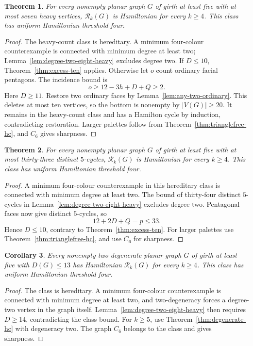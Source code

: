 \documentclass[11pt]{article}
\newtheorem{theorem}{Theorem}[section]
\newtheorem{corollary}[theorem]{Corollary}
\theoremstyle{remark}
\newcommand{\Rk}{\mathcal R_k}
\numberwithin{equation}{section}
\numberwithin{table}{section}
\begin{document}
\begin{theorem}\label{thm:seven-heavy}
For every nonempty planar graph $G$ of girth at least five with at
most seven heavy vertices, $\Rk(G)$ is Hamiltonian for every $k\ge4$.
This class has uniform Hamiltonian threshold four.
\end{theorem}
\begin{proof}
The heavy-count class is hereditary. A minimum four-colour
counterexample is connected with minimum degree at least two;
Lemma~\ref{lem:degree-two-eight-heavy} excludes degree two.
If $D\le10$, Theorem~\ref{thm:excess-ten} applies. Otherwise let
$o$ count ordinary facial pentagons. The incidence bound is
\[
 o\ge12-3h+D+Q\ge2.
\]
Here $D\ge11$. Restore two ordinary faces by
Lemma~\ref{lem:any-two-ordinary}. This deletes at most ten vertices, so the bottom is nonempty by $|V(G)|\ge20$.
It remains in the heavy-count class and has a Hamilton cycle by
induction, contradicting restoration. Larger palettes follow from
Theorem~\ref{thm:trianglefree-hc}, and $C_6$ gives sharpness.
\end{proof}

\begin{theorem}\label{thm:thirty-three-pentagons}
For every nonempty planar graph $G$ of girth at least five with at
most thirty-three distinct $5$-cycles, $\Rk(G)$ is Hamiltonian for
every $k\ge4$. This class has uniform Hamiltonian threshold four.
\end{theorem}
\begin{proof}
A minimum four-colour counterexample in this hereditary class is
connected with minimum degree at least two. The bound of thirty-four
distinct $5$-cycles in Lemma~\ref{lem:degree-two-eight-heavy} excludes
degree two.
Pentagonal faces now give distinct $5$-cycles, so
\[
 12+2D+Q=p\le33.
\]
Hence $D\le10$, contrary to Theorem~\ref{thm:excess-ten}.
For larger palettes use Theorem~\ref{thm:trianglefree-hc}, and use
$C_6$ for sharpness.
\end{proof}

\begin{corollary}\label{cor:two-degenerate-excess-thirteen}
Every nonempty two-degenerate planar graph $G$ of girth at least five
with $D(G)\le13$ has Hamiltonian $\Rk(G)$ for every $k\ge4$.
This class has uniform Hamiltonian threshold four.
\end{corollary}
\begin{proof}
The class is hereditary. A minimum four-colour counterexample
is connected with minimum degree at least two, and two-degeneracy
forces a degree-two vertex in the graph itself.
Lemma~\ref{lem:degree-two-eight-heavy} then requires
$D\ge14$, contradicting the class bound. For $k\ge5$, use
Theorem~\ref{thm:degenerate-hc} with degeneracy two. The graph $C_6$
belongs to the class and gives sharpness.
\end{proof}
\end{document}
